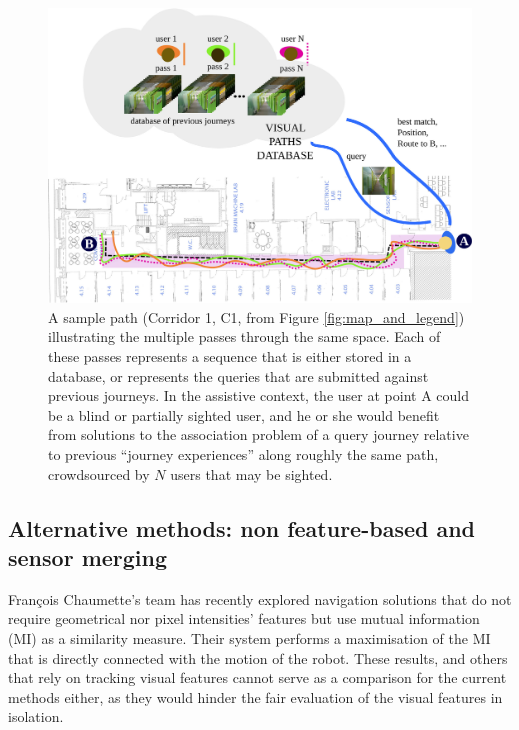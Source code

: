 \begin{figure}[t]

\begin{center}
\includegraphics[width=\linewidth]{./gfx/Chapter04/corridor.pdf}
\caption{ A sample path (Corridor 1, C1, from Figure \ref{fig:map_and_legend}) illustrating the multiple passes through the same space. Each of these passes represents a sequence that is either stored in a database, or represents the queries that are submitted against previous journeys. In the assistive context, the user at point A could be a blind or partially sighted user, and he or she would benefit from solutions to the association problem of a query journey relative to previous ``journey experiences'' along roughly the same path, crowdsourced by $N$ users that may be sighted.}
\label{fig:visualpaths}
\end{center}
\end{figure}

\subsection{Alternative methods: non feature-based and sensor merging} 
Fran\c{c}ois Chaumette's team has  recently explored navigation solutions that do not require geometrical nor pixel intensities' features but use mutual information (MI) as a similarity measure. Their system performs a maximisation of the MI that is directly connected with the motion of the robot. These results, and others that rely on tracking visual features \cite{Se2002} cannot serve as a comparison for the current methods either, as they would hinder the fair evaluation of the visual features in isolation.

